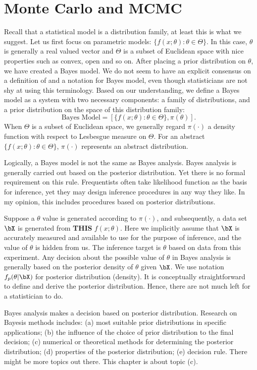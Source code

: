 \chapter{Monte Carlo and MCMC}

Recall that a statistical model is a distribution family, at least
this is what we suggest. 
Let us first focus on parametric models: $\{f(x; \theta): \theta \in \Theta\}$. 
In this case, $\theta$ is generally a real valued vector and $\Theta$ is a
subset of Euclidean space with nice properties such as convex, open and so on.
After placing a prior distribution on $\theta$, we have created a Bayes model. 
We do not seem to have an explicit consensus on a definition of and
a notation for Bayes model,
even though statisticians are not shy at using this terminology. 
Based on our understanding, we define a Bayes model as a system
with two necessary components: a family of distributions, and a prior
distribution on the space of this distribution family:
\[
\mbox{Bayes Model}
= [\{f(x; \theta): \theta \in \Theta\}, \pi(\theta)].
\]
When $\Theta$ is a subset of Euclidean space, we generally
regard $\pi(\cdot)$ a density function with respect to Lesbesgue
measure on $\Theta$. For an abstract $\{f(x; \theta): \theta \in \Theta\}$,
$\pi(\cdot)$ represents an abstract distribution.

Logically, a Bayes model is not the same as Bayes analysis.
Bayes analysis is generally carried out based on the posterior distribution.
Yet there is no formal requirement on this rule. Frequentists often
take likelihood function as the basis for inference, yet they may design
inference procedures in any way they like. In my opinion, this includes 
procedures based on posterior distributions.


Suppose a $\theta$ value is generated according to $\pi(\cdot)$, and
subsequently, a data set $\bX$ is generated from {\bf THIS} $f(x; \theta)$.
Here we implicitly assume that $\bX$ is accurately measured and
available to use for the purpose of inference, and the value of
$\theta$ is hidden from us. The inference target is
$\theta$ based on data from this experiment.
Any decision about the possible value of $\theta$ in Bayes analysis
is generally based on the posterior density of $\theta$ given $\bX$. 
We use notation $f_p(\theta | \bX)$ for posterior distribution (density).
It is conceptually straightforward to define and derive the posterior
distribution. Hence, there are not much left for a statistician to do.

Bayes analysis makes a decision based on posterior distribution.
Research on Bayesis methods includes: (a) most suitable
prior distributions in specific applications; (b) the influence of the
choice of prior distribution to the final decision; (c) numerical or
theoretical methods for determining the posterior distribution; 
(d) properties of the posterior distribution; (e) decision rule. 
There might be more topics out there.
This chapter is about topic (c).


